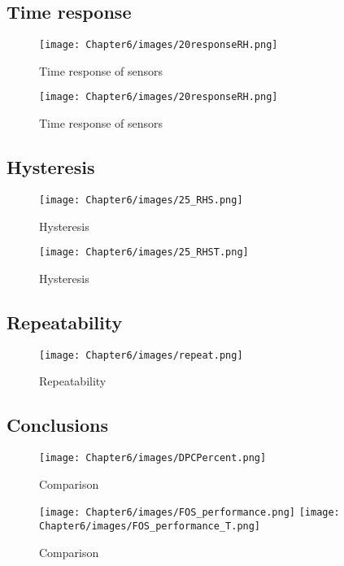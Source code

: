 \subsection{Time response}

\begin{figure}[!h]
\centering
\texttt{[image: Chapter6/images/20responseRH.png]}
\caption{Time response of sensors}
\label{fig_time_response}
\end{figure}

\begin{figure}[!h]
\centering
\texttt{[image: Chapter6/images/20responseRH.png]}
\caption{Time response of sensors}
\label{fig_time_response}
\end{figure}


\subsection{Hysteresis}

\begin{figure}[!h]
\centering
\texttt{[image: Chapter6/images/25\_RHS.png]}
\caption{Hysteresis}
\label{fig_hysteresis}
\end{figure}

\begin{figure}[!h]
\centering
\texttt{[image: Chapter6/images/25\_RHST.png]}
\caption{Hysteresis}
\label{fig_hysteresis2}
\end{figure}



\subsection{Repeatability}


\begin{figure}[!h]
\centering
\texttt{[image: Chapter6/images/repeat.png]}
\caption{Repeatability}
\label{fig_repeatability}
\end{figure}



\subsection{Conclusions}


\begin{figure}[!h]
\centering
\texttt{[image: Chapter6/images/DPCPercent.png]}
\caption{Comparison}
\label{fig_comparison}
\end{figure}

\begin{figure}[!h]
\centering
\texttt{[image: Chapter6/images/FOS\_performance.png]}
\texttt{[image: Chapter6/images/FOS\_performance\_T.png]}
\caption{Comparison}
\label{fig_comparison}
\end{figure}
